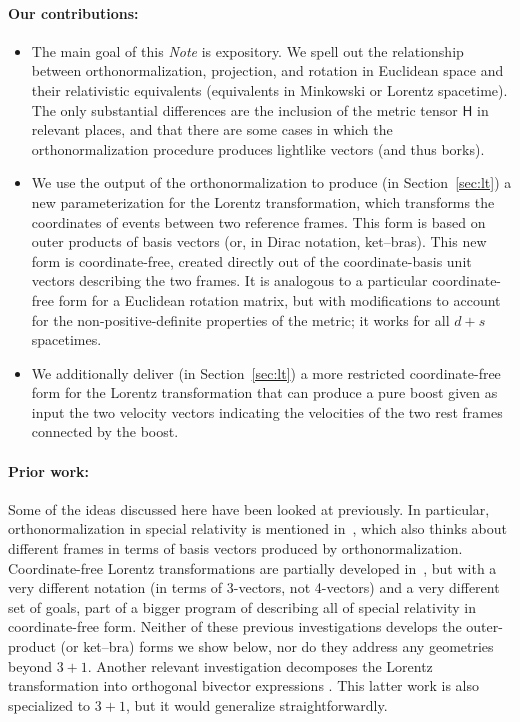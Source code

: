 \documentclass{article}
\newcommand{\metric}{\mathsf{H}}
\newcommand{\plus}{\!+\!} %
\newcommand{\documentname}{\textsl{Note}}
\newcommand{\secref}[1]{Section~\ref{#1}}
\begin{document}
\paragraph{Our contributions:}
\begin{itemize}
\item
The main goal of this \documentname{} is expository. We spell out the relationship between orthonormalization, projection, and rotation in Euclidean space and their relativistic equivalents (equivalents in Minkowski or Lorentz spacetime).
The only substantial differences are the inclusion of the metric tensor $\metric$ in relevant places, and that there are some cases in which the orthonormalization procedure produces lightlike vectors (and thus borks).
\item
We use the output of the orthonormalization to produce (in \secref{sec:lt}) a new parameterization for the Lorentz transformation, which transforms the coordinates of events between two reference frames.
This form is based on outer products of basis vectors (or, in Dirac notation, ket--bras).
This new form is coordinate-free, created directly out of the coordinate-basis unit vectors describing the two frames.
It is analogous to a particular coordinate-free form for a Euclidean rotation matrix, but with modifications to account for the non-positive-definite properties of the metric; it works for all $d\plus s$ spacetimes.
\item
We additionally deliver (in \secref{sec:lt}) a more restricted coordinate-free form for the Lorentz transformation that can produce a pure boost given as input the two velocity vectors indicating the velocities of the two rest frames connected by the boost.
\end{itemize}

\paragraph{Prior work:}
Some of the ideas discussed here have been looked at previously.
In particular, orthonormalization in special relativity is mentioned in~\cite{joot}, which also thinks about different frames in terms of basis vectors produced by orthonormalization.
Coordinate-free Lorentz transformations are partially developed in~\cite{wagner}, but with a very different notation (in terms of 3-vectors, not 4-vectors) and a very different set of goals, part of a bigger program of describing all of special relativity in coordinate-free form.
Neither of these previous investigations develops the outer-product (or ket--bra) forms we show below, nor do they address any geometries beyond $3\plus 1$.
Another relevant investigation decomposes the Lorentz transformation into orthogonal bivector expressions \cite{hanson}.
This latter work is also specialized to $3+1$, but it would generalize straightforwardly.
\end{document}

